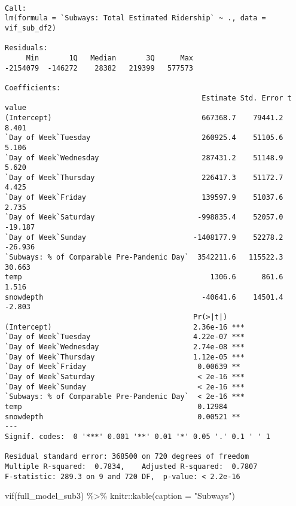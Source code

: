 \documentclass[
  letterpaper,
  DIV=11,
  numbers=noendperiod]{scrartcl}
\newenvironment{Shaded}{\begin{snugshade}}{\end{snugshade}}
\newcommand{\AttributeTok}[1]{\textcolor[rgb]{0.40,0.45,0.13}{#1}}
\newcommand{\FunctionTok}[1]{\textcolor[rgb]{0.28,0.35,0.67}{#1}}
\newcommand{\NormalTok}[1]{\textcolor[rgb]{0.00,0.23,0.31}{#1}}
\newcommand{\SpecialCharTok}[1]{\textcolor[rgb]{0.37,0.37,0.37}{#1}}
\newcommand{\StringTok}[1]{\textcolor[rgb]{0.13,0.47,0.30}{#1}}
\begin{document}
\begin{verbatim}

Call:
lm(formula = `Subways: Total Estimated Ridership` ~ ., data = vif_sub_df2)

Residuals:
     Min       1Q   Median       3Q      Max 
-2154079  -146272    28382   219399   577573 

Coefficients:
                                              Estimate Std. Error t value
(Intercept)                                   667368.7    79441.2   8.401
`Day of Week`Tuesday                          260925.4    51105.6   5.106
`Day of Week`Wednesday                        287431.2    51148.9   5.620
`Day of Week`Thursday                         226417.3    51172.7   4.425
`Day of Week`Friday                           139597.9    51037.6   2.735
`Day of Week`Saturday                        -998835.4    52057.0 -19.187
`Day of Week`Sunday                         -1408177.9    52278.2 -26.936
`Subways: % of Comparable Pre-Pandemic Day`  3542211.6   115522.3  30.663
temp                                            1306.6      861.6   1.516
snowdepth                                     -40641.6    14501.4  -2.803
                                            Pr(>|t|)    
(Intercept)                                 2.36e-16 ***
`Day of Week`Tuesday                        4.22e-07 ***
`Day of Week`Wednesday                      2.74e-08 ***
`Day of Week`Thursday                       1.12e-05 ***
`Day of Week`Friday                          0.00639 ** 
`Day of Week`Saturday                        < 2e-16 ***
`Day of Week`Sunday                          < 2e-16 ***
`Subways: % of Comparable Pre-Pandemic Day`  < 2e-16 ***
temp                                         0.12984    
snowdepth                                    0.00521 ** 
---
Signif. codes:  0 '***' 0.001 '**' 0.01 '*' 0.05 '.' 0.1 ' ' 1

Residual standard error: 368500 on 720 degrees of freedom
Multiple R-squared:  0.7834,    Adjusted R-squared:  0.7807 
F-statistic: 289.3 on 9 and 720 DF,  p-value: < 2.2e-16
\end{verbatim}

\begin{Shaded}
\begin{Highlighting}[]
\FunctionTok{vif}\NormalTok{(full\_model\_sub3) }\SpecialCharTok{\%\textgreater{}\%}\NormalTok{ knitr}\SpecialCharTok{::}\FunctionTok{kable}\NormalTok{(}\AttributeTok{caption =} \StringTok{"Subways"}\NormalTok{)}
\end{Highlighting}
\end{Shaded}
\end{document}
